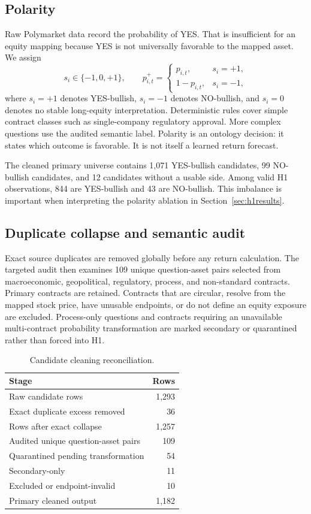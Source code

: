 \documentclass[sigconf,anonymous]{acmart}
\begin{document}
\subsection{Polarity}
\label{sec:polarity}

Raw Polymarket data record the probability of YES. That is insufficient for an equity mapping because YES is not universally favorable to the mapped asset. We assign
\[
s_i \in \{-1,0,+1\}, \qquad
p_{i,t}^{+} =
\begin{cases}
p_{i,t}, & s_i=+1,\\
1-p_{i,t}, & s_i=-1,
\end{cases}
\]
where $s_i=+1$ denotes YES-bullish, $s_i=-1$ denotes NO-bullish, and $s_i=0$ denotes no stable long-equity interpretation. Deterministic rules cover simple contract classes such as single-company regulatory approval. More complex questions use the audited semantic label. Polarity is an ontology decision: it states which outcome is favorable. It is not itself a learned return forecast.

The cleaned primary universe contains 1,071 YES-bullish candidates, 99 NO-bullish candidates, and 12 candidates without a usable side. Among valid H1 observations, 844 are YES-bullish and 43 are NO-bullish. This imbalance is important when interpreting the polarity ablation in Section~\ref{sec:h1results}.

\subsection{Duplicate collapse and semantic audit}
\label{sec:audit}

Exact source duplicates are removed globally before any return calculation. The targeted audit then examines 109 unique question-asset pairs selected from macroeconomic, geopolitical, regulatory, process, and non-standard contracts. Primary contracts are retained. Contracts that are circular, resolve from the mapped stock price, have unusable endpoints, or do not define an equity exposure are excluded. Process-only questions and contracts requiring an unavailable multi-contract probability transformation are marked secondary or quarantined rather than forced into H1.

\begin{table}[t]
\caption{Candidate cleaning reconciliation.}
\label{tab:cleaning}
\centering
\small
\begin{tabular}{lr}
\toprule
Stage & Rows \\
\midrule
Raw candidate rows & 1,293 \\
Exact duplicate excess removed & 36 \\
Rows after exact collapse & 1,257 \\
Audited unique question-asset pairs & 109 \\
Quarantined pending transformation & 54 \\
Secondary-only & 11 \\
Excluded or endpoint-invalid & 10 \\
Primary cleaned output & 1,182 \\
\bottomrule
\end{tabular}
\end{table}
\end{document}
